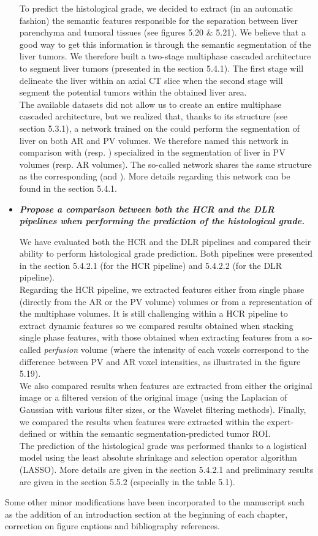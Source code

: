 \documentclass{article}
\begin{document}
\begin{itemize}
To predict the histological grade, we decided to extract (in an automatic fashion) the semantic features responsible for the separation between liver parenchyma and tumoral tissues (see figures 5.20 \& 5.21). We believe that a good way to get this information is through the semantic segmentation of the liver tumors. We therefore built a two-stage multiphase cascaded architecture to segment liver tumors (presented in the section 5.4.1). The first stage will delineate the liver within an axial CT slice when the second stage will segment the potential tumors within the obtained liver area.\\
The available datasets did not allow us to create an entire multiphase cascaded architecture, but we realized that, thanks to its structure (see section 5.3.1), a network trained on the  could perform the segmentation of liver on both AR and PV volumes. We therefore named this network  in comparison with  (resp. ) specialized in the segmentation of liver in PV volumes (resp. AR volumes). The so-called  network shares the same structure as the corresponding  (and ). More details regarding this network can be found in the section 5.4.1.

\item \textit{\textbf{Propose a comparison between both the HCR and the DLR pipelines when performing the prediction of the histological grade.}}

We have evaluated both the HCR and the DLR pipelines and compared their ability to perform histological grade prediction. 
Both pipelines were presented in the section 5.4.2.1 (for the HCR pipeline) and 5.4.2.2 (for the DLR pipeline). \\
Regarding the HCR pipeline, we extracted features either from single phase (directly from the AR or the PV volume) volumes or from a representation of the multiphase volumes.
It is still challenging within a HCR pipeline to extract dynamic features so we compared results obtained when stacking single phase features, with those obtained when extracting features from a so-called \textit{perfusion} volume (where the intensity of each voxels correspond to the difference between PV and AR voxel intensities, as illustrated in the figure 5.19). \\
We also compared results when features are extracted from either the original image or a filtered version of the original image (using the Laplacian of Gaussian with various filter sizes, or the Wavelet filtering methods).
Finally, we compared the results when features were extracted within the expert-defined or within the semantic segmentation-predicted tumor ROI. \\
The prediction of the histological grade was performed thanks to a logistical model using the least absolute shrinkage and selection operator algorithm (LASSO). More details are given in the section 5.4.2.1 and preliminary results are given in the section 5.5.2 (especially in the table 5.1).

\end{itemize}

\vspace{0.2cm}
Some other minor modifications have been incorporated to the manuscript such as the addition of an introduction section at the beginning of each chapter, correction on figure captions and bibliography references.
\end{document}
